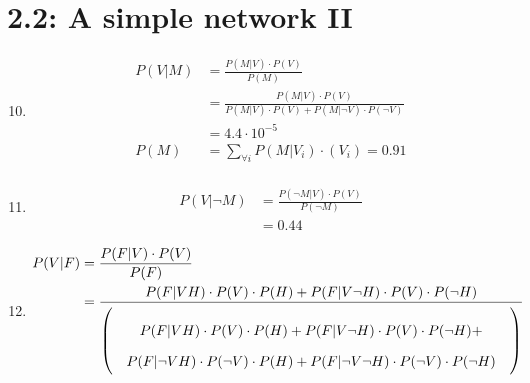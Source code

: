 \documentclass[a4paper,10pt,fleqn]{article}
\begin{document}
\section*{2.2: A simple network II}

\begin{enumerate}[1.]
    \setcounter{enumi}{9}

    \item
        \begin{align*}
            P(V|M)
                & = \frac{P(M|V)\cdot P(V)}{P(M)} \\
                & = \frac{P(M|V)\cdot P(V)}{P(M|V)\cdot P(V) + P(M|\lnot V)\cdot P(\lnot V)} \\
                & = 4.4 \cdot 10^{-5} \\
            P(M)
                & = \sum_{\forall i} P(M|V_i) \cdot (V_i) = 0.91 \\
        \end{align*}

    \item
        \begin{align*}
            P(V|\lnot M)
                & = \frac{P(\lnot M|V) \cdot P(V)}{P(\lnot M)} \\
                & = 0.44
        \end{align*}

    \item
        \begin{align*}
            P(V|F)
                & = \frac{P(F|V)\cdot P(V)}{P(F)}  \\
                & = \frac{
                        P(F|VH) \cdot P(V) \cdot P(H) +
                        P(F|V \lnot H) \cdot P(V) \cdot P(\lnot H)
                      }{
                        \left( \parbox{10cm}{
                            $$P(F|VH) \cdot P(V) \cdot P(H) +
                            P(F|V \lnot H) \cdot P(V) \cdot P(\lnot H) +$$
                            $$P(F|\lnot VH) \cdot P(\lnot V) \cdot P(H) +
                            P(F|\lnot V\lnot H) \cdot P(\lnot V) \cdot P(\lnot H)$$
                        } \right)
                      }
        \end{align*}


\end{enumerate}
\end{document}
